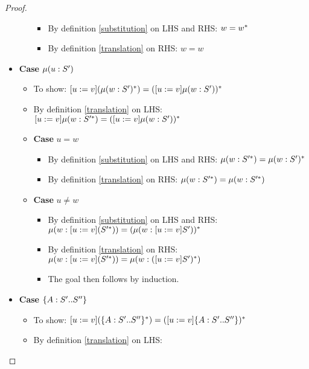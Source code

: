 \begin{proof}
\begin{itemize}
\begin{itemize}
\begin{itemize}
                \item By definition \ref{substitution} on LHS and RHS:
                    $w = w^{*}$
                \item By definition \ref{translation} on RHS: $w = w$
            \end{itemize}
        \end{itemize}
        \item \textbf{Case} $\mu(u : S')$
        \begin{itemize}
            \item To show: $[u := v](\mu(w : S')^{*}) =
                ([u := v]\mu(w : S'))^{*}$
            \item By definition \ref{translation} on LHS:
                $[u := v]\mu(w : S'^{*}) = ([u := v]\mu(w : S'))^{*}$
            \item \textbf{Case} $u = w$
            \begin{itemize}
                \item By definition \ref{substitution} on LHS and RHS:
                    $\mu(w : S'^{*}) = \mu(w : S')^{*}$
                \item By definition \ref{translation} on RHS:
                    $\mu(w : S'^{*}) = \mu(w : S'^{*})$
            \end{itemize}
            \item \textbf{Case} $u \neq w$
            \begin{itemize}
                \item By definition \ref{substitution} on LHS and RHS:
                    $\mu(w : [u := v](S'^{*})) =
                    (\mu(w : [u := v]S'))^{*}$
                \item By definition \ref{translation} on RHS:
                    $\mu(w : [u := v](S'^{*})) =
                    \mu(w : ([u := v]S')^{*})$
                \item The goal then follows by induction.
            \end{itemize}
        \end{itemize}
        \item \textbf{Case} $\{A : S' .. S''\}$
        \begin{itemize}
            \item To show: $[u := v](\{A : S' .. S''\}^{*}) =
                ([u := v]\{A : S' .. S''\})^{*}$
            \item By definition \ref{translation} on LHS:

\end{itemize}
\end{itemize}
\end{proof}
